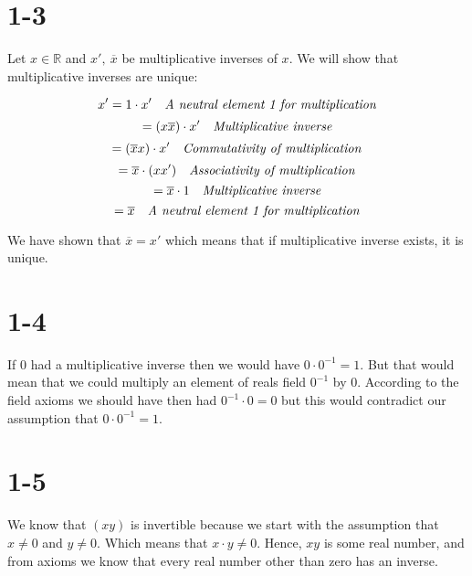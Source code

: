 \documentclass{article}
\begin{document}
\section*{1-3}

Let \(x \in \mathbb{R}\) and \(x', \  \overline{x}\) be multiplicative inverses of \(x\). 
We will show that multiplicative inverses are unique:

\begin{equation*}
    x' = 1 \cdot x' \ \ \ \mbox{\emph{A neutral element 1 for multiplication}}
\end{equation*}
\begin{equation*}
    = (x \overline{x}) \cdot x' \ \ \ \mbox{\emph{Multiplicative inverse}}
\end{equation*}
\begin{equation*}
    = (\overline{x} x) \cdot x' \ \ \ \mbox{\emph{Commutativity of multiplication}}
\end{equation*}
\begin{equation*}
    = \overline{x} \cdot (xx') \ \ \ \mbox{\emph{Associativity of multiplication}}
\end{equation*}
\begin{equation*}
    = \overline{x} \cdot 1 \ \ \ \mbox{\emph{Multiplicative inverse}}
\end{equation*}
\begin{equation*}
    = \overline{x} \ \ \ \mbox{\emph{A neutral element 1 for multiplication}}
\end{equation*}

We have shown that \(\overline{x} = x'\) which means that if multiplicative inverse exists, it is unique.

\section*{1-4}

If \(0\) had a multiplicative inverse then we would have \(0 \cdot 0^{-1} = 1\). But that 
would mean that we could multiply an element of reals field \(0^{-1}\) by \(0\). According to
the field axioms we should have then had \(0^{-1} \cdot 0 = 0\) but this would contradict our
assumption that \(0 \cdot 0^{-1} = 1\).

\section*{1-5}

We know that \((xy)\) is invertible because we start with the assumption that \(x \neq 0\) and \(y \neq 0\).
Which means that \(x \cdot y \neq 0\). Hence, \(xy\) is some real number, and from axioms we know that
every real number other than zero has an inverse.  
\end{document}
